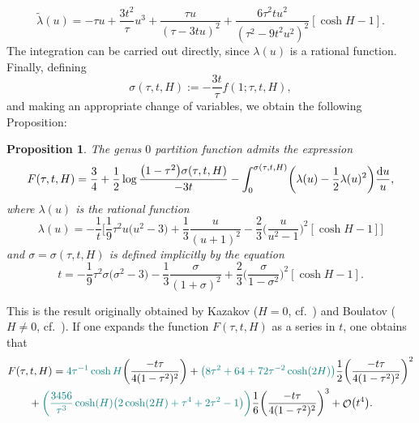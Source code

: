 \documentclass[pdftex]{sigma}
\DeclareMathOperator{\OO}{\mathcal{O}}
\numberwithin{equation}{section}
\newtheorem{Proposition}[Theorem]{Proposition}
 { \theoremstyle{definition}
\newtheorem{Definition}[Theorem]{Definition}
\newtheorem{Note}[Theorem]{Note}
\newtheorem{Example}[Theorem]{Example}
\newtheorem{Remark}[Theorem]{Remark} }
\begin{document}
 \begin{equation*}
 \tilde{\lambda}(u) = -\tau u + \frac{3t^2}{\tau}u^3 + \frac{\tau u}{(\tau - 3tu)^2}+\frac{6\tau^2tu^2}{(\tau^2-9t^2u^2)^2}[\cosh H -1].
 \end{equation*}
The integration can be carried out directly, since $\lambda(u)$ is a rational function. Finally, defining
 \begin{equation*}
 \sigma(\tau,t,H) := -\frac{3t}{\tau}f(1;\tau,t,H),
 \end{equation*}
and making an appropriate change of variables, we obtain the following Proposition:
 \begin{Proposition}
 The genus $0$ partition function admits the expression
 \begin{equation*}
 F(\tau,t,H) = \frac{3}{4} + \frac{1}{2}\log \frac{\bigl(1-\tau^2\bigr)\sigma(\tau,t,H)}{-3t} - \int_{0}^{\sigma(\tau,t,H)}\biggl(\lambda(u)-\frac{1}{2}\lambda(u)^2\biggr) \frac{{\rm d}u}{u},
 \end{equation*}
 where $\lambda(u)$ is the rational function
 \begin{equation*}
 \lambda(u) = -\frac{1}{t}\biggl[\frac{1}{9}\tau^2u\bigl(u^2-3\bigr) + \frac{1}{3}\frac{u}{(u+1)^2} - \frac{2}{3}\biggl(\frac{u}{u^2-1}\biggr)^2[\cosh H -1]\biggr]
 \end{equation*}
 and $\sigma = \sigma(\tau,t,H)$ is defined implicitly by the equation
 \begin{equation*}
 t = -\frac{1}{9}\tau^2\sigma \bigl(\sigma^2 - 3\bigr) -\frac{1}{3}\frac{\sigma}{(1+\sigma)^2} + \frac{2}{3}\biggl(\frac{\sigma}{1-\sigma^2}\biggr)^2[\cosh H -1].
 \end{equation*}
 \end{Proposition}
This is the result originally obtained by Kazakov ($H=0$, cf.~\cite{Kazakov1}) and Boulatov ($H\neq 0$, cf.~\cite{Kazakov2}). If one expands
the function $F(\tau,t,H)$ as a series in $t$, one obtains that
 \begin{align} \label{Kazakov-F}
 &F(\tau,t,H)= \textcolor{teal}{4\tau^{-1}\cosh{H}}\biggl(\frac{-t\tau}{4(1-\tau^2)^2}\biggr) + \textcolor{teal}{\bigl(8\tau^2 + 64 +72\tau^{-2}\cosh(2H)\bigr)}\frac{1}{2}\biggl(\frac{-t\tau}{4(1-\tau^2)^2}\biggr)^2 \nonumber \\
 &\qquad{}+\textcolor{teal}{\biggl(\frac{3456}{\tau^3}\cosh(H)\bigl(2\cosh(2H)+\tau^4+2\tau^2-1\bigr)\biggr)}\frac{1}{6}\biggl(\frac{-t\tau}{4(1-\tau^2)^2}\biggr)^3 + \OO\bigl(t^4\bigr).
 \end{align}
\end{document}
